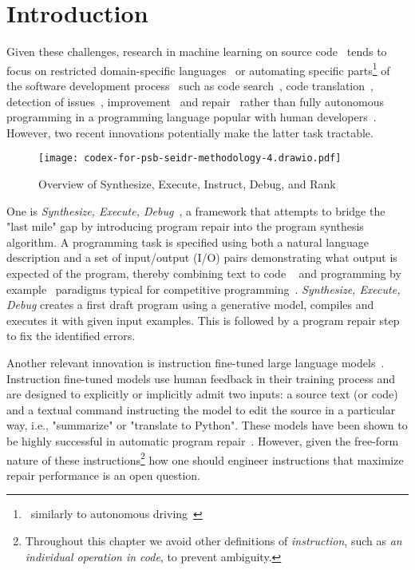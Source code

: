 \newpage \section{Introduction}
\label{sec:intro}





Given these challenges, research in machine learning on source code~\cite{allamanis2018:survey} tends to focus on restricted domain-specific languages~\cite{chen2021:latent,flashmeta,liventsev2021:bf} or automating specific parts\footnote{~similarly to autonomous driving~\cite{grigorescu2020:survey,marcano2020:review}} of the software development process~\cite{lu2021:codexglue,niu2023:crosscodebench} such as code search~\cite{husain2020:codesearchnet}, code translation~\cite{roziere2020:unsupervised}, detection of issues~\cite{fernandes2016:reviewbased,chakraborty2021:deep}, improvement~\cite{petke2018:genetic} and repair~\cite{gouesAutomatedProgramRepair2019} rather than fully autonomous programming in a programming language popular with human developers~\cite{:tiobe}.
However, two recent innovations potentially make the latter task tractable.

\begin{figure*}
    \centering
    \texttt{[image: codex-for-psb-seidr-methodology-4.drawio.pdf]}
    \caption{Overview of Synthesize, Execute, Instruct, Debug, and Rank}
    \label{fig:method}
\end{figure*}

One is \emph{Synthesize, Execute, Debug}~\cite{guptaSynthesizeExecuteDebug2020}, a framework that attempts to bridge the "last mile" gap by introducing program repair into the program synthesis algorithm. 
A programming task is specified using both a natural language description and a set of input/output (I/O) pairs demonstrating what output is expected of the program, thereby combining text to code ~\cite{iyer2018:mapping} and programming by example~\cite{halbertProgrammingExample1984,gulwani2016:programming} paradigms typical for competitive programming~\cite{zavershynskyi2018:naps}.
\emph{Synthesize, Execute, Debug} creates a first draft program using a generative model, compiles and executes it with given input examples.
This is followed by a program repair step to fix the identified errors.

Another relevant innovation is instruction fine-tuned large language models~\cite{ouyang2022:training}. Instruction fine-tuned models use human feedback in their training process and are designed to explicitly or implicitly admit two inputs: a source text (or code) and a textual command instructing the model to edit the source in a particular way, i.e., "summarize" or "translate to Python".
These models have been shown to be highly successful in automatic program repair~\cite{fanAutomatedRepairPrograms2023}. 
However, given the free-form nature of these instructions\footnote{Throughout this chapter we avoid other definitions of \emph{instruction}, such as \emph{an individual operation in code}, to prevent ambiguity.} how one should engineer instructions that maximize repair performance is an open question. 

